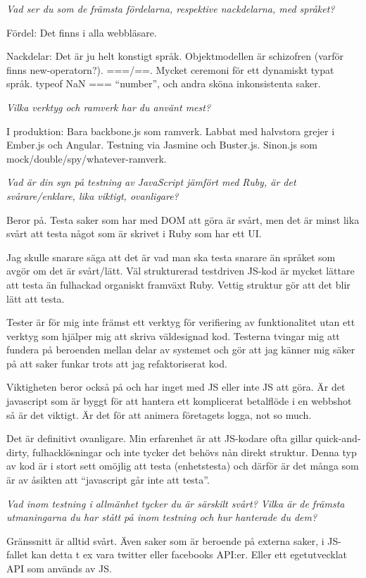 \documentclass[11pt]{article}
\begin{document}
\emph{Vad ser du som de främsta fördelarna, respektive nackdelarna, med språket?}

Fördel: Det finns i alla webbläsare.

Nackdelar: Det är ju helt konstigt språk. Objektmodellen är schizofren
(varför finns new-operatorn?). ===/==. Mycket ceremoni för ett dynamiskt
typat språk. typeof NaN === ``number'', och andra sköna inkonsistenta saker.

\emph{Vilka verktyg och ramverk har du använt mest?}

I produktion: Bara backbone.js som ramverk. Labbat med halvstora grejer i
Ember.js och Angular. Testning via Jasmine och Buster.js. Sinon.js som
mock/double/spy/whatever-ramverk.

\emph{Vad är din syn på testning av JavaScript jämfört med Ruby, är det
svårare/enklare, lika viktigt, ovanligare?}

Beror på. Testa saker som har med DOM att göra är svårt, men det är minst
lika svårt att testa något som är skrivet i Ruby som har ett UI.

Jag skulle snarare säga att det är vad man ska testa snarare än språket
som avgör om det är svårt/lätt. Väl strukturerad testdriven JS-kod är
mycket lättare att testa än fulhackad organiskt framväxt Ruby. Vettig
struktur gör att det blir lätt att testa.

Tester är för mig inte främst ett verktyg för verifiering av
funktionalitet utan ett verktyg som hjälper mig att skriva väldesignad
kod. Testerna tvingar mig att fundera på beroenden mellan delar av
systemet och gör att jag känner mig säker på att saker funkar trots att
jag refaktoriserat kod.

Viktigheten beror också på och har inget med JS eller inte JS att göra. Är
det javascript som är byggt för att hantera ett komplicerat betalflöde i
en webbshot så är det viktigt. Är det för att animera företagets logga,
not so much.

Det är definitivt ovanligare. Min erfarenhet är att JS-kodare ofta gillar
quick-and-dirty, fulhacklösningar och inte tycker det behövs nån direkt
struktur. Denna typ av kod är i stort sett omöjlig att testa (enhetstesta)
och därför är det många som är av åsikten att ``javascript går inte att
testa''.

\emph{Vad inom testning i allmänhet tycker du är särskilt svårt? Vilka är de
främsta utmaningarna du har stått på inom testning och hur hanterade du
dem?}

Gränssnitt är alltid svårt. Även saker som är beroende på externa saker, i
JS-fallet kan detta t ex vara twitter eller facebooks API:er. Eller ett
egetutvecklat API som används av JS.
\end{document}
